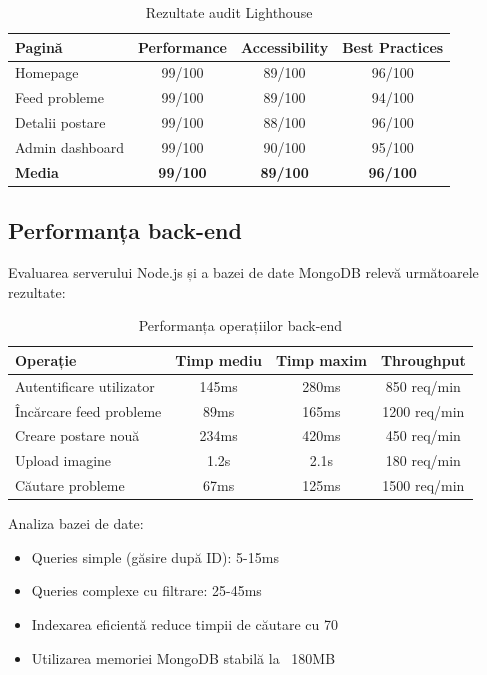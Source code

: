 \documentclass[12pt,a4paper]{report}
\begin{document}
\begin{table}[H]
\centering
\caption{Rezultate audit Lighthouse}
\label{tab:lighthouse_results}
\begin{tabular}{|l|c|c|c|}
\hline
\textbf{Pagină} & \textbf{Performance} & \textbf{Accessibility} & \textbf{Best Practices} \\
\hline
Homepage & 99/100 & 89/100 & 96/100 \\
\hline
Feed probleme & 99/100 & 89/100 & 94/100 \\
\hline
Detalii postare & 99/100 & 88/100 & 96/100 \\
\hline
Admin dashboard & 99/100 & 90/100 & 95/100 \\
\hline
\textbf{Media} & \textbf{99/100} & \textbf{89/100} & \textbf{96/100} \\
\hline
\end{tabular}
\end{table}


\subsection{Performanța back-end}

Evaluarea serverului Node.js și a bazei de date MongoDB relevă următoarele rezultate:

\begin{table}[H]
\centering
\caption{Performanța operațiilor back-end}
\label{tab:backend_performance}
\begin{tabular}{|l|c|c|c|}
\hline
\textbf{Operație} & \textbf{Timp mediu} & \textbf{Timp maxim} & \textbf{Throughput} \\
\hline
Autentificare utilizator & 145ms & 280ms & 850 req/min \\
\hline
Încărcare feed probleme & 89ms & 165ms & 1200 req/min \\
\hline
Creare postare nouă & 234ms & 420ms & 450 req/min \\
\hline
Upload imagine & 1.2s & 2.1s & 180 req/min \\
\hline
Căutare probleme & 67ms & 125ms & 1500 req/min \\
\hline
\end{tabular}
\end{table}

Analiza bazei de date:
\begin{itemize}
\item Queries simple (găsire după ID): 5-15ms
\item Queries complexe cu filtrare: 25-45ms
\item Indexarea eficientă reduce timpii de căutare cu 70%
\item Utilizarea memoriei MongoDB stabilă la ~180MB
\end{itemize}
\end{document}
